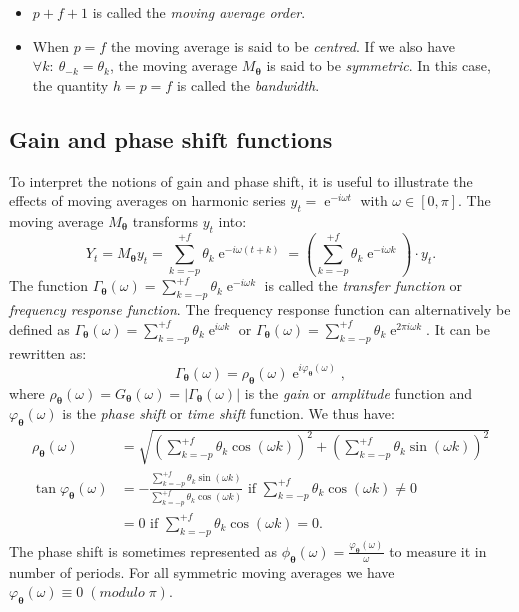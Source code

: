 \documentclass[
]{article}
\DeclareMathOperator{\e}{e}
\newcommand\1{\mathds{1}}
\begin{document}
\begin{itemize}
\item
  \(p+f+1\) is called the \emph{moving average order}.
\item
  When \(p=f\) the moving average is said to be \emph{centred}. If we
  also have \(\forall k:\:\theta_{-k} = \theta_k\), the moving average
  \(M_{\boldsymbol\theta}\) is said to be \emph{symmetric}. In this
  case, the quantity \(h=p=f\) is called the \emph{bandwidth}.
\end{itemize}

\subsection{Gain and phase shift functions}\label{subsec:gain-deph}

To interpret the notions of gain and phase shift, it is useful to
illustrate the effects of moving averages on harmonic series
\(y_t=\e^{-i\omega t}\) with \(\omega\in[0,\pi]\). The moving average
\(M_{\boldsymbol\theta}\) transforms \(y_t\) into: \[
Y_t = M_{\boldsymbol\theta}y_t = \sum_{k=-p}^{+f} \theta_k \e^{-i \omega (t+k)}
= \left(\sum_{k=-p}^{+f} \theta_k \e^{-i \omega k}\right)\cdot y_t.
\] The function
\(\Gamma_{\boldsymbol\theta}(\omega)=\sum_{k=-p}^{+f} \theta_k \e^{-i \omega k}\)
is called the \emph{transfer function} or \emph{frequency response
function}. The frequency response function can alternatively be defined
as
\(\Gamma_{\boldsymbol\theta}(\omega)=\sum_{k=-p}^{+f} \theta_k \e^{i \omega k}\)
or
\(\Gamma_{\boldsymbol\theta}(\omega)=\sum_{k=-p}^{+f} \theta_k \e^{2\pi i \omega k}\).
It can be rewritten as: \[
\Gamma_{\boldsymbol\theta}(\omega) = \rho_{\boldsymbol\theta}(\omega)\e^{i\varphi_{\boldsymbol\theta}(\omega)},
\] where
\(\rho_{\boldsymbol\theta}(\omega)=G_{\boldsymbol\theta}(\omega)=\lvert\Gamma_{\boldsymbol\theta}(\omega)\rvert\)
is the \emph{gain} or \emph{amplitude} function and
\(\varphi_{\boldsymbol\theta}(\omega)\) is the \emph{phase shift} or
\emph{time shift} function. We thus have: \begin{align*}
\rho_{\boldsymbol\theta}(\omega) &=\sqrt{\left(\sum_{k=-p}^{+f}\theta_k\cos(\omega k)\right)^2+
\left(\sum_{k=-p}^{+f}\theta_k\sin(\omega k)\right)^2} \\
\tan \varphi_{\boldsymbol\theta}(\omega) &=- \frac{\sum_{k=-p}^{+f}\theta_k\sin(\omega k)}{\sum_{k=-p}^{+f}\theta_k\cos(\omega k)} \text{ if }\sum_{k=-p}^{+f}\theta_k\cos(\omega k) \ne 0 \\
&= 0 \text{ if }\sum_{k=-p}^{+f}\theta_k\cos(\omega k) = 0.
\end{align*} The phase shift is sometimes represented as
\(\phi_{\boldsymbol\theta}(\omega)=\frac{\varphi_{\boldsymbol\theta}(\omega)}{\omega}\)
to measure it in number of periods. For all symmetric moving averages we
have \(\varphi_{\boldsymbol\theta}(\omega)\equiv 0 \;(modulo\;{\pi})\).
\end{document}
